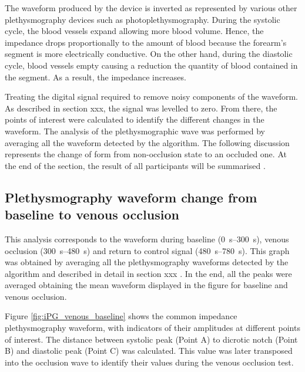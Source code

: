 The waveform produced by the device is inverted as represented by various other plethysmography devices such as photoplethysmography. During the systolic cycle, the blood vessels expand allowing more blood volume. Hence, the impedance drops proportionally to the amount of blood because the forearm's segment is more electrically conductive. On the other hand, during the diastolic cycle, blood vessels empty causing a reduction the quantity of blood contained in the segment. As a result, the impedance increases.  

Treating the digital signal required to remove noisy components of the waveform. As described in section xxx, the signal was levelled to zero.  From there, the points of interest were calculated to identify the different changes in the waveform. The analysis of the plethysmographic wave was performed by averaging all the waveform detected by the algorithm. The following discussion represents the change of form from non-occlusion state to an occluded one. At the end of the section, the result of all participants will be summarised .

\subsection{Plethysmography waveform change from baseline to venous occlusion}
\label{section5.3.1}
This analysis corresponds to the waveform during baseline (\SIrange{0}{300}{\second}), venous occlusion (\SIrange{300}{480}{\second}) and return to control signal (\SIrange{480}{780}{\second}). This graph was obtained by averaging all the plethysmography waveforms detected by the algorithm and described in detail in section xxx . In the end, all the peaks were averaged obtaining the mean waveform displayed in the figure for baseline and venous occlusion.

Figure \ref{fig:iPG_venous_baseline} shows the common impedance plethysmography waveform, with indicators of their amplitudes at different points of interest. The distance between systolic peak (Point A) to dicrotic notch (Point B) and diastolic peak (Point C) was calculated. This value was later transposed into the occlusion wave to identify their values during the venous occlusion test.

